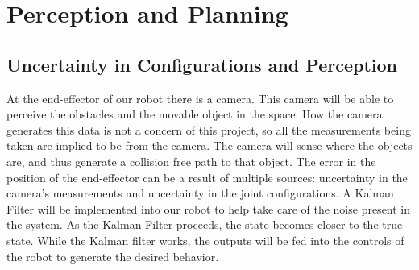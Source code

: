 \section{Perception and Planning}
\subsection{Uncertainty in Configurations and Perception}
At the end-effector of our robot there is a camera.  This camera will be able to perceive the obstacles and the movable object in the space.  How the camera generates this data is not a concern of this project, so all the measurements being taken are implied to be from the camera.  The camera will sense where the objects are, and thus generate a collision free path to that object.  The error in the position of the end-effector can be a result of multiple sources: uncertainty in the camera's measurements and uncertainty in the joint configurations.  A Kalman Filter will be implemented into our robot to help take care of the noise present in the system.  As the Kalman Filter proceeds, the state becomes closer to the true state.  While the Kalman filter works, the outputs will be fed into the controls of the robot to generate the desired behavior.